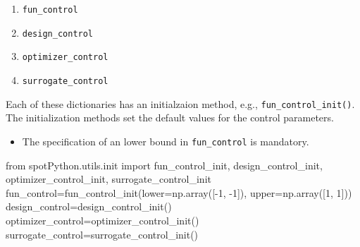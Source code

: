 \documentclass[
  letterpaper,
  DIV=11,
  numbers=noendperiod]{scrreprt}
\newenvironment{Shaded}{\begin{snugshade}}{\end{snugshade}}
\newcommand{\DecValTok}[1]{\textcolor[rgb]{0.68,0.00,0.00}{#1}}
\newcommand{\ImportTok}[1]{\textcolor[rgb]{0.00,0.46,0.62}{#1}}
\newcommand{\NormalTok}[1]{\textcolor[rgb]{0.00,0.23,0.31}{#1}}
\newcommand{\OperatorTok}[1]{\textcolor[rgb]{0.37,0.37,0.37}{#1}}
\providecommand{\tightlist}{%
  \setlength{\itemsep}{0pt}\setlength{\parskip}{0pt}}\usepackage{longtable,booktabs,array}
\begin{document}
\begin{enumerate}
\def\labelenumi{\arabic{enumi}.}
\tightlist
\item
  \texttt{fun\_control}
\item
  \texttt{design\_control}
\item
  \texttt{optimizer\_control}
\item
  \texttt{surrogate\_control}
\end{enumerate}

Each of these dictionaries has an initialzaion method, e.g.,
\texttt{fun\_control\_init()}. The initialization methods set the
default values for the control parameters.

\begin{tcolorbox}[enhanced jigsaw, rightrule=.15mm, coltitle=black, title=\textcolor{quarto-callout-important-color}{\faExclamation}\hspace{0.5em}{Important:}, opacitybacktitle=0.6, bottomrule=.15mm, opacityback=0, left=2mm, colback=white, leftrule=.75mm, colframe=quarto-callout-important-color-frame, colbacktitle=quarto-callout-important-color!10!white, toprule=.15mm, toptitle=1mm, bottomtitle=1mm, titlerule=0mm, breakable, arc=.35mm]

\begin{itemize}
\tightlist
\item
  The specification of an lower bound in \texttt{fun\_control} is
  mandatory.
\end{itemize}

\end{tcolorbox}

\begin{Shaded}
\begin{Highlighting}[]
\ImportTok{from}\NormalTok{ spotPython.utils.init }\ImportTok{import}\NormalTok{ fun\_control\_init, design\_control\_init, optimizer\_control\_init, surrogate\_control\_init}
\NormalTok{fun\_control}\OperatorTok{=}\NormalTok{fun\_control\_init(lower}\OperatorTok{=}\NormalTok{np.array([}\OperatorTok{{-}}\DecValTok{1}\NormalTok{, }\OperatorTok{{-}}\DecValTok{1}\NormalTok{]),}
\NormalTok{                            upper}\OperatorTok{=}\NormalTok{np.array([}\DecValTok{1}\NormalTok{, }\DecValTok{1}\NormalTok{]))}
\NormalTok{design\_control}\OperatorTok{=}\NormalTok{design\_control\_init()}
\NormalTok{optimizer\_control}\OperatorTok{=}\NormalTok{optimizer\_control\_init()}
\NormalTok{surrogate\_control}\OperatorTok{=}\NormalTok{surrogate\_control\_init()}
\end{Highlighting}
\end{Shaded}
\end{document}
